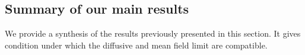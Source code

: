 \documentclass[onefignum,onetabnum]{siamart251216} %
\renewcommand{\d}{\mathrm{d}}
\newcommand{\torus}{\mathbb T}
\newcommand{\real}{\mathbb R}
\newcommand{\mc}[1]{\mathcal{#1}}
\renewcommand{\geq}{\geqslant}
\newcommand{\mescin}{\mu}
\newcommand{\DeffN}{\mc{D}^{\mathrm{eff},N}}
\newcommand{\vP}[1]{\mathbf{p}^{#1}}
\newcommand{\vQ}[1]{\mathbf{q}^{#1}}
\newcommand{\SolPois}{\Phi^\infty}
\theoremstyle{plain}
\numberwithin{equation}{section}
\numberwithin{theorem}{section}
\begin{document}
\subsection{Summary of our main results}
\label{sec:synthesis}
We provide a synthesis of the results previously presented in this section. It gives condition under which the diffusive and mean field limit are compatible.
\end{document}
